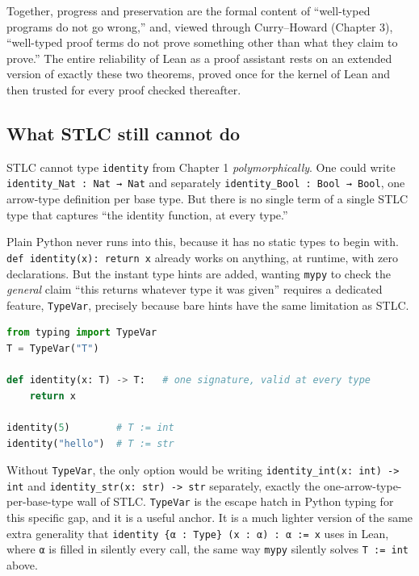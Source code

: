 Together, progress and preservation are the formal content of ``well-typed programs do not go wrong,'' and, viewed through Curry--Howard (Chapter 3), ``well-typed proof terms do not prove something other than what they claim to prove.'' The entire reliability of Lean as a proof assistant rests on an extended version of exactly these two theorems, proved once for the kernel of Lean and then trusted for every proof checked thereafter.

\subsection{What STLC still cannot do}\label{sec:05-rigor-check:03-typing-rules-and-safety:5}

STLC cannot type \texttt{identity} from Chapter 1 \emph{polymorphically}. One could write \texttt{identity\_\allowbreak{}Nat : Nat → Nat} and separately \texttt{identity\_\allowbreak{}Bool : Bool → Bool}, one arrow-type definition per base type. But there is no single term of a single STLC type that captures ``the identity function, at every type.''

\begin{progcorner}

Plain Python never runs into this, because it has no static types to begin with. \texttt{def identity(x): return x} already works on anything, at runtime, with zero declarations. But the instant type hints are added, wanting \texttt{mypy} to check the \emph{general} claim ``this returns whatever type it was given'' requires a dedicated feature, \texttt{TypeVar}, precisely because bare hints have the same limitation as STLC.

\end{progcorner}

\begin{lstlisting}[language=Python,style=python]
from typing import TypeVar
T = TypeVar("T")

def identity(x: T) -> T:   # one signature, valid at every type
    return x

identity(5)        # T := int
identity("hello")  # T := str
\end{lstlisting}

Without \texttt{TypeVar}, the only option would be writing \texttt{identity\_\allowbreak{}int(x: int) -\allowbreak{}> int} and \texttt{identity\_\allowbreak{}str(x: str) -\allowbreak{}> str} separately, exactly the one-arrow-type-per-base-type wall of STLC. \texttt{TypeVar} is the escape hatch in Python typing for this specific gap, and it is a useful anchor. It is a much lighter version of the same extra generality that \texttt{identity \{α : Type\} (x : α) : α := x} uses in Lean, where \texttt{α} is filled in silently every call, the same way \texttt{mypy} silently solves \texttt{T := int} above.

